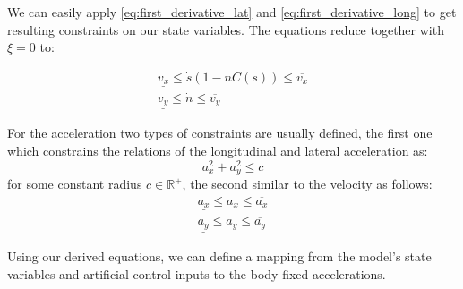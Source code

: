 We can easily apply \eqref{eq:first_derivative_lat} and \eqref{eq:first_derivative_long} to get resulting constraints on our state variables.
The equations reduce together with $\xi = 0$ to:

\begin{align}
	\underline{v_x}  \leq  \dot{s}(1-nC(s))  \leq  \overline{v_x} \\
	\underline{v_y}  \leq  \dot{n}           \leq  \overline{v_y}
\end{align}

For the acceleration two types of constraints are usually defined, the first one which constrains the relations of the longitudinal and lateral acceleration as:
\begin{equation}
	a_x^2 + a_y^2 \leq c
\end{equation}
for some constant radius $c\in \mathbb{R}^+$, the second similar to the velocity as follows:
\begin{align}
	\underline{a_x} \leq a_x \leq \overline{a_x} \\
	\underline{a_y} \leq a_y \leq \overline{a_y}
\end{align}

Using our derived equations, we can define a mapping from the model's state variables and artificial control inputs to the body-fixed accelerations.

